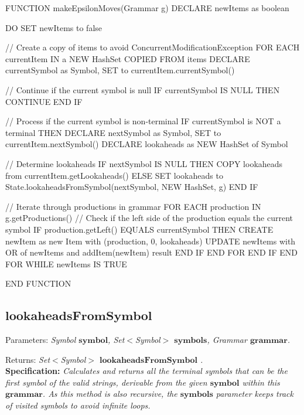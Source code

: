 \begin{codeblock}
    FUNCTION makeEpsilonMoves(Grammar g)
    DECLARE newItems as boolean

    DO
    SET newItems to false

    // Create a copy of items to avoid ConcurrentModificationException
    FOR EACH currentItem IN a NEW HashSet COPIED FROM items
    DECLARE currentSymbol as Symbol, SET to currentItem.currentSymbol()

    // Continue if the current symbol is null
    IF currentSymbol IS NULL THEN
    CONTINUE
    END IF

    // Process if the current symbol is non-terminal
    IF currentSymbol is NOT a terminal THEN
    DECLARE nextSymbol as Symbol, SET to currentItem.nextSymbol()
    DECLARE lookaheads as NEW HashSet of Symbol

    // Determine lookaheads
    IF nextSymbol IS NULL THEN
    COPY lookaheads from currentItem.getLookaheads()
    ELSE
    SET lookaheads to State.lookaheadsFromSymbol(nextSymbol, NEW HashSet, g)
    END IF

    // Iterate through productions in grammar
    FOR EACH production IN g.getProductions()
    // Check if the left side of the production equals the current symbol
    IF production.getLeft() EQUALS currentSymbol THEN
    CREATE newItem as new Item with (production, 0, lookaheads)
    UPDATE newItems with OR of newItems and addItem(newItem) result
    END IF
    END FOR
    END IF
    END FOR
    WHILE newItems IS TRUE

    END FUNCTION
\end{codeblock}

\vspace{30pt}

\subsection{\(\boldsymbol{lookaheadsFromSymbol}\)}

Parameters: \textit{Symbol \(\boldsymbol{symbol}\), Set\(<\)Symbol\(>\) \(\boldsymbol{symbols}\), Grammar \(\boldsymbol{grammar}\).}

Returns: \textit{Set\(<\)Symbol\(>\) \(\boldsymbol{lookaheadsFromSymbol}\) .}\\

\textbf{Specification:} \textit{Calculates and returns all the terminal symbols that can be the first symbol of the valid strings, derivable from the given \(\boldsymbol{symbol}\) within this \(\boldsymbol{grammar}\). As this method is also recursive, the \(\boldsymbol{symbols}\) parameter keeps track of visited symbols to avoid infinite loops.}\\

